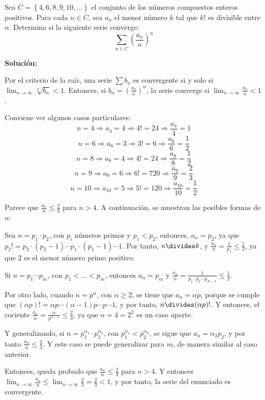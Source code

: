 \documentclass[../../main.tex]{subfiles}
\begin{document}
  \begin{shaded}
    Sea $C = \left\{4, 6, 8, 9, 10, \dots\right\}$ el conjunto de los números compuestos enteros positivos. Para cada $n \in C$, sea $a_n$ el menor número $k$ tal que $k!$ es divisible entre $n$. Determina si la siguiente serie converge:
    $$
    \sum_{n \in C} \left(\frac{a_n}{n}\right)^n
    $$
  \end{shaded}

  \textbf{Solución:}

  Por el criterio de la raíz, una serie $\displaystyle\sum b_n$ es convergente si y solo si $\displaystyle\lim_{n \to \infty} \sqrt[n]{b_n} < 1$. Entonces, si $b_n = \left(\displaystyle\frac{a_n}{n}\right)^n$, la serie converge si $\displaystyle\lim_{n \to \infty} \displaystyle\frac{a_n}{n} < 1$.

  Conviene ver algunos casos particulares:
  $$
  n = 4 \Longrightarrow a_4 = 4 \Longrightarrow 4! = 24 \Longrightarrow \frac{a_4}{4} = 1
  $$
  $$
  n = 6 \Longrightarrow a_6 = 3 \Longrightarrow 3! = 6 \Longrightarrow \frac{a_6}{6} = \frac{1}{2}
  $$
  $$
  n = 8 \Longrightarrow a_8 = 4 \Longrightarrow 4! = 24 \Longrightarrow \frac{a_8}{8} = \frac{1}{2}
  $$
  $$
  n = 9 \Longrightarrow a_9 = 6 \Longrightarrow 6! = 720 \Longrightarrow \frac{a_9}{9} = \frac{2}{3}
  $$
  $$
  n = 10 \Longrightarrow a_{10} = 5 \Longrightarrow 5! = 120 \Longrightarrow \frac{a_{10}}{10} = \frac{1}{2}
  $$

  Parece que $\displaystyle\frac{a_n}{n} \leq \displaystyle\frac{2}{3}$ para $n > 4$. A continuación, se muestran las posibles formas de $n$:

  Sea $n = p_1 \cdot p_2$, con $p_i$ números primos y $p_1 < p_2$, entonces, $a_n = p_2$, ya que $p_2! = p_2 \cdot (p_2 - 1) \cdots p_1 \cdot (p_1 - 1) \cdots 1$. Por tanto, $n \divides k$, y $\displaystyle\frac{a_n}{n} = \displaystyle\frac{1}{p_1} \leq \displaystyle\frac{1}{2}$, ya que $2$ es el menor número primo positivo.

  Si $n = p_1 \cdots p_m$, con $p_1 < \dots < p_m$, entonces $a_n = p_m$ y $\displaystyle\frac{a_n}{n} = \displaystyle\frac{1}{p_1 \cdot p_2 \cdots p_{m - 1}} \leq \displaystyle\frac{1}{2}$.

  Por otro lado, cuando $n = p^\alpha$, con $\alpha \geq 2$, se tiene que $a_n = \alpha p$, porque se cumple que $(\alpha p)! = \alpha p \cdots (\alpha - 1)p \cdots p \cdots 1$, y por tanto, $n \divides (\alpha p)!$. Y entonces, el cociente $\displaystyle\frac{a_n}{n} = \frac{\alpha}{p^{\alpha - 1}} \leq \displaystyle\frac{2}{3}$, ya que $n = 4 = 2^2$ es un caso aparte.

  Y generalizando, si $n = p_1^{\alpha_1} \cdot p_2^{\alpha_2}$, con $p_1^{\alpha_1} < p_2^{\alpha_2}$, se sigue que $a_n = \alpha_2 p_2$, y por tanto $\displaystyle\frac{a_n}{n} \leq \displaystyle\frac{2}{3}$. Y este caso se puede generalizar para $m$, de manera similar al caso anterior.

  Entonces, queda probado que $\displaystyle\frac{a_n}{n} \leq \displaystyle\frac{2}{3}$ para $n > 4$. Y entonces $\displaystyle\lim_{n \to \infty} \displaystyle\frac{a_n}{n} \leq \displaystyle\lim_{n \to \infty} \displaystyle\frac{2}{3} = \displaystyle\frac{2}{3} < 1$, y por tanto, la serie del enunciado es convergente.
\end{document}
